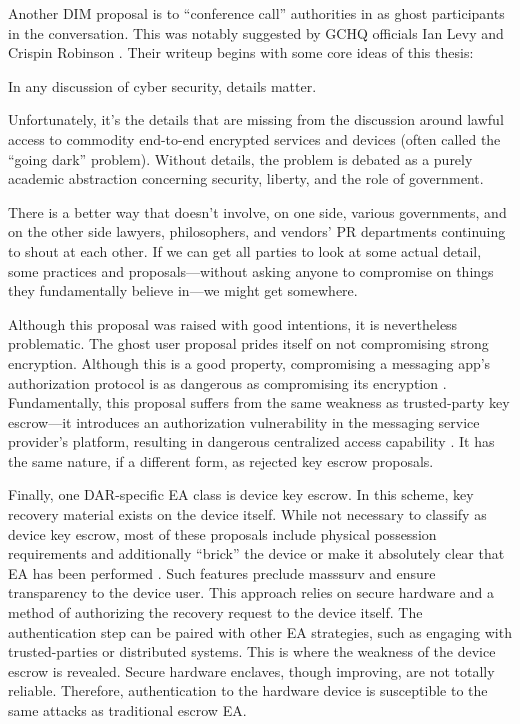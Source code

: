 Another \ac{DIM} proposal is to ``conference call'' authorities in as ghost participants in the conversation. This was
notably suggested by \ac{GCHQ} officials Ian Levy and Crispin Robinson \cite{levy_robinson_2018}. Their writeup begins
with some core ideas of this thesis:

\begin{displayquote}
In any discussion of cyber security, details matter.

Unfortunately, it's the details that are missing from the discussion around lawful access to commodity end-to-end
encrypted services and devices (often called the ``going dark'' problem). Without details, the problem is debated as a
purely academic abstraction concerning security, liberty, and the role of government.

There is a better way that doesn’t involve, on one side, various governments, and on the other side lawyers,
philosophers, and vendors' PR departments continuing to shout at each other. If we can get all parties to look at some
actual detail, some practices and proposals---without asking anyone to compromise on things they fundamentally believe
in---we might get somewhere.
\cite{levy_robinson_2018}
\end{displayquote}

Although this proposal was raised with good intentions, it is nevertheless problematic. The ghost user proposal prides
itself on not compromising strong encryption. Although this is a good property, compromising a messaging app's
authorization protocol is as dangerous as compromising its encryption \cite{callas_1_2019}. Fundamentally, this proposal
suffers from the same weakness as trusted-party key escrow---it introduces an authorization vulnerability in the
messaging service provider's platform, resulting in dangerous centralized access capability \cite{schneier_ghost_2019}.
It has the same nature, if a different form, as rejected key escrow proposals.

Finally, one \ac{DAR}-specific \ac{EA} class is device key escrow. In this scheme, key recovery material exists on the
device itself. While not necessary to classify as device key escrow, most of these proposals include physical possession
requirements and additionally ``brick'' the device or make it absolutely clear that \ac{EA} has been performed
\cite{savage_lawful_2018} \cite{ozzie_2018}. Such features preclude \ac{masssurv} and ensure transparency to the device
user. This approach relies on secure hardware and a method of authorizing the recovery request to the device itself. The
authentication step can be paired with other \ac{EA} strategies, such as engaging with trusted-parties or distributed
systems. This is where the weakness of the device escrow is revealed. Secure hardware enclaves, though improving, are
not totally reliable. Therefore, authentication to the hardware device is susceptible to the same attacks as traditional
escrow \ac{EA}.

